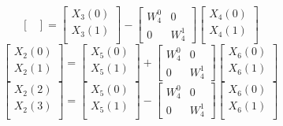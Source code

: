 \documentclass[journal,12pt,twocolumn]{IEEEtran}
\renewcommand\thesection{\arabic{section}}
\begin{document}
\begin{enumerate}[label=\thesection.\arabic*
	,ref=\thesection.\theenumi]
\begin{enumerate}[label=\arabic*.,ref=\thesection.\theenumi]
\begin{equation}
\begin{bmatrix}
		\end{bmatrix}
		=
		\begin{bmatrix}
			X_{3}(0) \\ 
			X_{3}(1)\\ 
		\end{bmatrix}
		-
		\begin{bmatrix}
			W^{0}_{4} & 0\\
			0 & W^{1}_{4}
		\end{bmatrix}
		\begin{bmatrix}
			X_{4}(0) \\ 
			X_{4}(1) \\ 
		\end{bmatrix}
	\end{equation}
	\begin{equation}
		\begin{bmatrix}
			X_{2}(0) \\ 
			X_{2}(1)\\ 
		\end{bmatrix}
		=
		\begin{bmatrix}
			X_{5}(0) \\ 
			X_{5}(1)\\ 
		\end{bmatrix}
		+
		\begin{bmatrix}
			W^{0}_{4} & 0\\
			0 & W^{1}_{4}
		\end{bmatrix}
		\begin{bmatrix}
			X_{6}(0) \\ 
			X_{6}(1) \\ 
		\end{bmatrix}
	\end{equation}
	\begin{equation}
		\begin{bmatrix}
			X_{2}(2) \\ 
			X_{2}(3)\\ 
		\end{bmatrix}
		=
		\begin{bmatrix}
			X_{5}(0) \\ 
			X_{5}(1)\\ 
		\end{bmatrix}
		-
		\begin{bmatrix}
			W^{0}_{4} & 0\\
			0 & W^{1}_{4}
		\end{bmatrix}
		\begin{bmatrix}
			X_{6}(0) \\ 
			X_{6}(1) \\ 

\end{bmatrix}
\end{equation}
\end{enumerate}
\end{enumerate}
\end{document}
